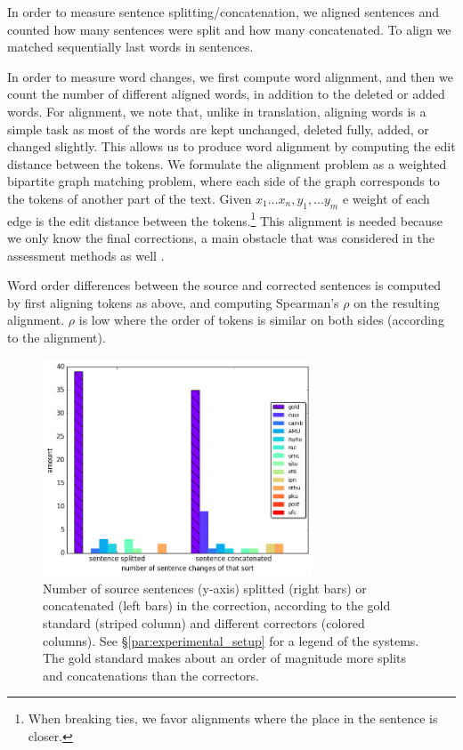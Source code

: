 \documentclass[english]{article}
\begin{document}
In order to measure sentence splitting/concatenation, we aligned sentences and counted how
many sentences were split and how many concatenated. To align we matched sequentially last
words in sentences.

In order to measure word changes, we first compute word alignment,
and then we count the number of different aligned words,
in addition to the deleted or added words.
For alignment, we note that, unlike in translation,
aligning words is a simple task as most of the words are kept unchanged,
deleted fully, added, or changed slightly. This allows us to
produce word alignment by computing the edit distance between the tokens.
We formulate the alignment problem as a weighted bipartite graph matching problem,
where each side of the graph corresponds to the tokens of another part of the text.
Given $x_1\ldots x_n,y_1,\ldots y_m$ e weight of each edge is the edit distance between the tokens.\footnote{When breaking ties, we favor alignments where the place in the sentence is closer.}
This alignment is needed because we only know the final corrections,
a main obstacle that was considered in the assessment methods as well
\cite{dahlmeier2012better}.

Word order differences between the source and corrected sentences is
computed by first aligning tokens as above, and computing Spearman's $\rho$ on the resulting alignment.
$\rho$ is low where the order of tokens is similar on both sides (according to the alignment).


\begin{figure}
	\includegraphics[width = 8cm]{aligned}
	\caption{Number of source sentences (y-axis) splitted (right bars) or concatenated (left bars) in the correction,
          according to
          the gold standard (striped column) and different correctors (colored columns). See \S\ref{par:experimental_setup} for a legend
          of the systems. The gold standard makes about an order of magnitude more splits and
          concatenations than the correctors.}
	\label{fig:split}
\end{figure}
\end{document}
